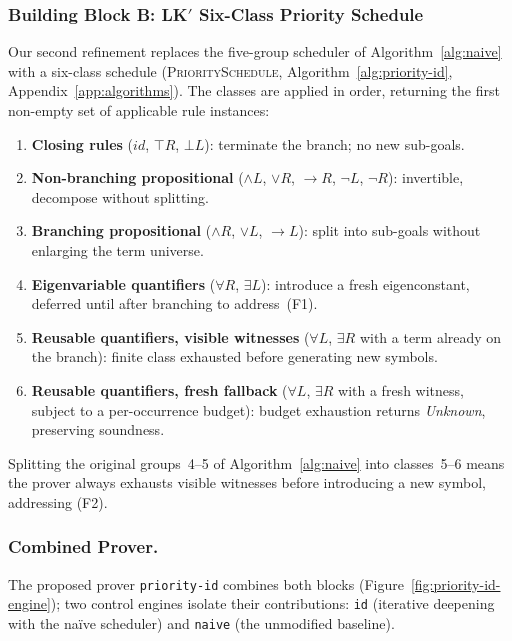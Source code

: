 \subsubsection{Building Block B: LK$'$ Six-Class Priority Schedule}

Our second refinement replaces the five-group scheduler of
Algorithm~\ref{alg:naive} with a six-class schedule
(\textsc{PrioritySchedule}, Algorithm~\ref{alg:priority-id},
Appendix~\ref{app:algorithms}).
The classes are applied in order, returning the first non-empty set of
applicable rule instances:

\begin{enumerate}
  \item \textbf{Closing rules} ($\mathit{id}$, $\top R$, $\bot L$):
    terminate the branch; no new sub-goals.
  \item \textbf{Non-branching propositional} ($\wedge L$, $\vee R$,
    ${\rightarrow}R$, $\neg L$, $\neg R$): invertible, decompose without
    splitting.
  \item \textbf{Branching propositional} ($\wedge R$, $\vee L$,
    ${\rightarrow}L$): split into sub-goals without enlarging the term
    universe.
  \item \textbf{Eigenvariable quantifiers} ($\forall R$, $\exists L$):
    introduce a fresh eigenconstant, deferred until after branching to
    address~(F1).
  \item \textbf{Reusable quantifiers, visible witnesses} ($\forall L$,
    $\exists R$ with a term already on the branch): finite class
    exhausted before generating new symbols.
  \item \textbf{Reusable quantifiers, fresh fallback} ($\forall L$,
      $\exists R$ with a fresh witness, subject to a per-occurrence
    budget): budget exhaustion returns \textit{Unknown}, preserving
    soundness.
\end{enumerate}

Splitting the original groups~4--5 of Algorithm~\ref{alg:naive} into
classes~5--6 means the prover always exhausts visible witnesses before
introducing a new symbol, addressing (F2).

\subsubsection{Combined Prover.}

The proposed prover \texttt{priority-id} combines both blocks
(Figure~\ref{fig:priority-id-engine}); two control engines isolate their
contributions: \texttt{id} (iterative deepening with the na\"ive scheduler)
and \texttt{naive} (the unmodified baseline).

